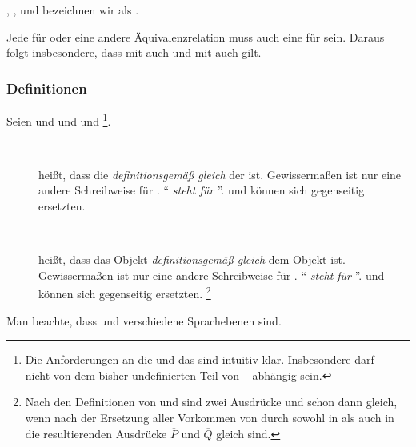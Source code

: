 \objqt{=}, \objqt{\ne}, \objqt{\equiv} und \objqt{\nequiv} bezeichnen wir als  \emph{}.

Jede  für \objqt{\equiv} oder eine andere Äquivalenzrelation muss auch eine für \objqt{\eq} sein.
Daraus folgt insbesondere, dass mit  auch  und mit  auch  gilt.

\subsubsection{Definitionen}%
\label{subsub:Definitionen}

{
	\newcommand*{\A}{\overline{A}}
	\newcommand*{\B}{\overline{B}}
	Seien \objqt{\A} und \objqt{\B}  und  und  \footnote{%
		Die Anforderungen an die  \objqt{\A} und das   sind intuitiv klar.
		Insbesondere darf \objqt{\B} \textbzw\  nicht von dem bisher undefinierten Teil von \objqt{\A} \textbzw\  abhängig sein.%
	}.
	\begin{description}
		\item[~\emph{}]\label{def:Metadefinition}
		\forqt{\A \metadefeq \B} heißt, dass die  \objqt{\A} \emph{definitionsgemäß gleich} der  \objqt{\B} ist.
		Gewissermaßen ist \objqt{\A} nur eine andere Schreibweise für \objqt{\B}.
		\enquote{\objqt{\A} \emph{steht für} \objqt{\B}}.
		\objqt{\A} und \objqt{\B} können sich gegenseitig ersetzten.
		\item[~\emph{}]\label{def:Definition}
		 heißt, dass das Objekt  \emph{definitionsgemäß gleich} dem Objekt  ist.
		Gewissermaßen ist  nur eine andere Schreibweise für .
		\enquote{ \emph{steht für} }.
		 und  können sich gegenseitig ersetzten.%
		\footnote{%
			Nach den Definitionen von \objqt{\metadefeq} und  sind zwei Ausdrücke  und  schon dann gleich, wenn nach der Ersetzung aller Vorkommen von  durch  sowohl in  als auch in  die resultierenden Ausdrücke $\overline{P}$ und $\overline{Q}$ gleich sind.%
		}

	\end{description}
	Man beachte, dass \objqt{\metadefeq} und  verschiedene Sprachebenen sind.
}

